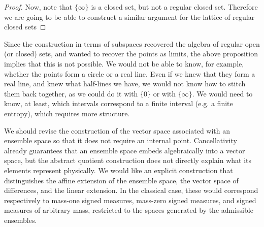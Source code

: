 \begin{proof}
	Now, note that $\{\infty\}$ is a closed set, but not a regular closed set. Therefore we are going to be able to construct a similar argument for the lattice of regular closed sets
\end{proof}

Since the construction in terms of subspaces recovered the algebra of regular open (or closed) sets, and wanted to recover the points as limits, the above proposition implies that this is not possible. We would not be able to know, for example, whether the points form a circle or a real line. Even if we knew that they form a real line, and knew what half-lines we have, we would not know how to stitch them back together, as we could do it with $\{0\}$ or with $\{\infty\}$. We would need to know, at least, which intervals correspond to a finite interval (e.g. a finite entropy), which requires more structure.

\ifdraft

\openproblembreak

{We should revise the construction of the vector space associated with an ensemble space so that it does not require an internal point. Cancellativity already guarantees that an ensemble space embeds algebraically into a vector space, but the abstract quotient construction does not directly explain what its elements represent physically. We would like an explicit construction that distinguishes the affine extension of the ensemble space, the vector space of differences, and the linear extension. In the classical case, these would correspond respectively to mass-one signed measures, mass-zero signed measures, and signed measures of arbitrary mass, restricted to the spaces generated by the admissible ensembles.}

